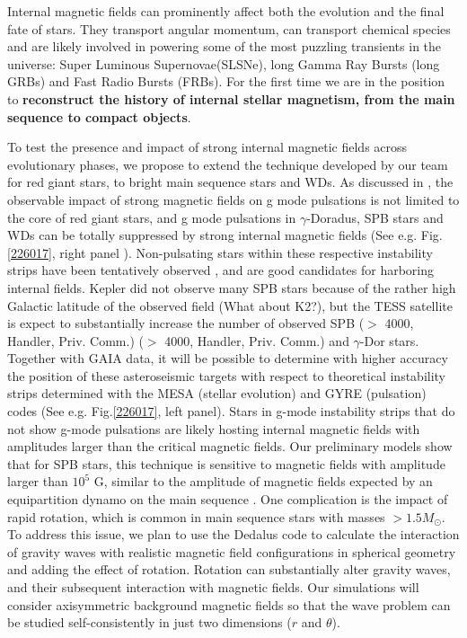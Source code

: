 Internal magnetic fields can prominently affect both the evolution and the final fate of stars. They transport angular momentum, can transport chemical species
and are likely involved in powering some of the most puzzling transients in the universe: Super Luminous Supernovae(SLSNe), long Gamma Ray Bursts (long GRBs) and Fast Radio Bursts (FRBs).
For the first time we are in the position to \textbf{reconstruct the history of internal stellar magnetism, from the main sequence to compact objects}.

To test the presence and impact of strong internal magnetic fields across evolutionary phases,
we propose to extend the technique developed by our team for red giant stars, to bright main sequence stars and WDs.
As discussed in \citet{Cantiello_2016}, the observable impact of strong magnetic fields on g mode pulsations is not limited to the core of red giant stars, and
 g mode pulsations in $\gamma$-Doradus, SPB stars and WDs can be totally suppressed by strong internal magnetic fields (See e.g. Fig.\ref{226017}, right panel ).
Non-pulsating stars within these respective instability strips have been tentatively observed \citep{Balona_2011}, and are good candidates for harboring internal fields.
Kepler did not observe many SPB stars because of the rather high Galactic latitude of the observed field (What about K2?), but the TESS satellite is expect to substantially increase the number of observed SPB ($>$ 4000, Handler, Priv. Comm.) ($>$ 4000, Handler, Priv. Comm.) and $\gamma$-Dor stars.    
Together with GAIA data, it will be possible to determine with higher accuracy the position of these asteroseismic targets with respect to
theoretical instability strips determined with the MESA (stellar evolution) and GYRE (pulsation) codes (See e.g. Fig.\ref{226017}, left panel).
Stars in g-mode instability strips that do not show g-mode pulsations are likely hosting internal magnetic fields with amplitudes larger than the critical
magnetic fields. Our preliminary models show that for SPB stars, this technique is sensitive to magnetic fields with amplitude larger than $10^5$ G,
similar to the amplitude of magnetic fields expected by an equipartition dynamo on the main sequence \citep[See e.g.][]{Featherstone_2009,Augustson_2016}.
One complication is the impact of rapid rotation, which is common in main sequence stars with masses $> 1.5M_\odot$. To address this issue,
we plan to use the Dedalus code to calculate the interaction of gravity waves with realistic magnetic field configurations in spherical geometry \citep[e.g.][]{Braithwaite_2006} 
and adding the effect of rotation. Rotation can substantially alter gravity waves, and their subsequent interaction with magnetic fields. Our simulations will consider axisymmetric background magnetic fields so that the wave problem can be studied self-consistently in just two dimensions ($r$ and $\theta$). 